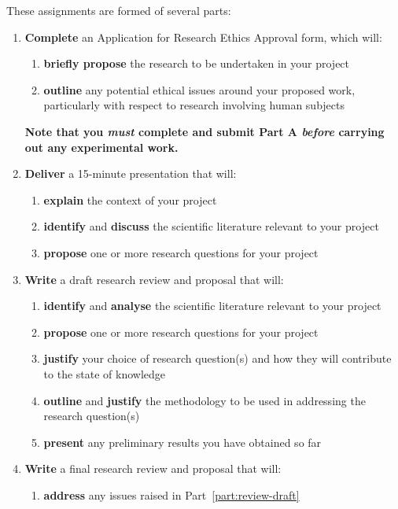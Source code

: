 \documentclass{../fal_assignment}
\begin{document}
These assignments are formed of several parts:
\begin{enumerate}[label=(\Alph*)]
	\item \textbf{Complete} an Application for Research Ethics Approval form,
		which will:
		\begin{enumerate}[label=(\roman*)]
			\item \textbf{briefly propose} the research to be undertaken in your project
			\item \textbf{outline} any potential ethical issues around your proposed work,
				particularly with respect to research involving human subjects
		\end{enumerate}
		\textbf{Note that you \textit{must} complete and submit Part A
		\textit{before} carrying out any experimental work.}
	\item \textbf{Deliver} a 15-minute presentation that will:
		\begin{enumerate}[label=(\roman*)]
			\item \textbf{explain} the context of your project
			\item \textbf{identify} and \textbf{discuss} the scientific literature
				relevant to your project
			\item \textbf{propose} one or more research questions for your project
		\end{enumerate}
	\item \label{part:review-draft} \textbf{Write} a draft research review and proposal
		that will:
		\begin{enumerate}[label=(\roman*)]
			\item \textbf{identify} and \textbf{analyse} the scientific literature
				relevant to your project
			\item \textbf{propose} one or more research questions for your project
			\item \textbf{justify} your choice of research question(s)
				and how they will contribute to the state of knowledge
			\item \textbf{outline} and \textbf{justify} the methodology to be used
				in addressing the research question(s)
			\item \textbf{present} any preliminary results you have obtained so far
		\end{enumerate}
	\item \textbf{Write} a final research review and proposal that will:
		\begin{enumerate}[label=(\roman*)]
			\item \textbf{address} any issues raised in Part~\ref{part:review-draft}

\end{enumerate}
\end{enumerate}
\end{document}
